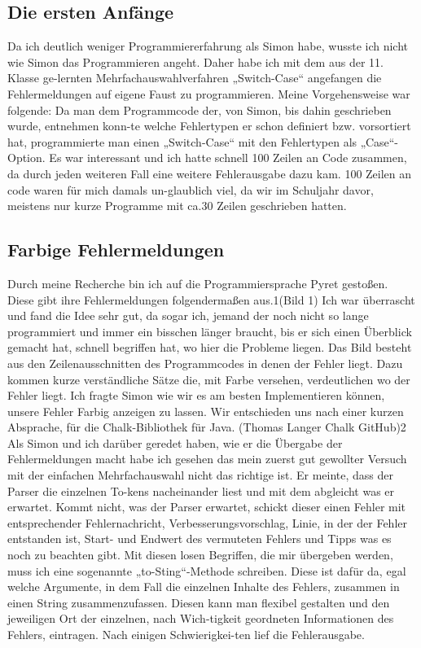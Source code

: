 \documentclass[a4paper, 12pt]{article}
\begin{document}
\subsection{Die ersten Anfänge}
Da ich deutlich weniger Programmiererfahrung als Simon habe, wusste ich nicht wie Simon das Programmieren angeht. Daher habe ich mit dem aus der 11. Klasse ge-lernten Mehrfachauswahlverfahren „Switch-Case“ angefangen die Fehlermeldungen auf eigene Faust zu programmieren.  Meine Vorgehensweise war folgende: Da man dem Programmcode der, von Simon, bis dahin geschrieben wurde, entnehmen konn-te welche Fehlertypen er schon definiert bzw. vorsortiert hat, programmierte man einen „Switch-Case“ mit den Fehlertypen als „Case“-Option. Es war interessant und ich hatte schnell 100 Zeilen an Code zusammen, da durch jeden weiteren Fall eine weitere Fehlerausgabe dazu kam. 100 Zeilen an code waren für mich damals un-glaublich viel, da wir im Schuljahr davor, meistens nur kurze Programme mit ca.30 Zeilen geschrieben hatten.

\subsection{Farbige Fehlermeldungen}
Durch meine Recherche bin ich auf die Programmiersprache Pyret gestoßen. Diese gibt ihre Fehlermeldungen folgendermaßen aus.1(Bild 1)
Ich war überrascht und fand die Idee sehr gut, da sogar ich, jemand der noch nicht so lange programmiert und immer ein bisschen länger braucht, bis er sich einen Überblick gemacht hat, schnell begriffen hat, wo hier die Probleme liegen. Das Bild besteht aus den Zeilenausschnitten des Programmcodes in denen der Fehler liegt. Dazu kommen kurze verständliche Sätze die, mit Farbe versehen, verdeutlichen wo der Fehler liegt. 
Ich fragte Simon wie wir es am besten Implementieren können, unsere Fehler Farbig anzeigen zu lassen. Wir entschieden uns nach einer kurzen Absprache, für die Chalk-Bibliothek für Java. (Thomas Langer Chalk GitHub)2
Als Simon und ich darüber geredet haben, wie er die Übergabe der Fehlermeldungen macht habe ich gesehen das mein zuerst gut gewollter Versuch mit der einfachen Mehrfachauswahl nicht das richtige ist. Er meinte, dass der Parser die einzelnen To-kens nacheinander liest und mit dem abgleicht was er erwartet. Kommt nicht, was der Parser erwartet, schickt dieser einen Fehler mit entsprechender Fehlernachricht, Verbesserungsvorschlag, Linie, in der der Fehler entstanden ist, Start- und Endwert des vermuteten Fehlers und Tipps was es noch zu beachten gibt. 
Mit diesen losen Begriffen, die mir übergeben werden, muss ich eine sogenannte „to-Sting“-Methode schreiben. Diese ist dafür da, egal welche Argumente, in dem Fall die einzelnen Inhalte des Fehlers, zusammen in einen String zusammenzufassen. Diesen kann man flexibel gestalten und den jeweiligen Ort der einzelnen, nach Wich-tigkeit geordneten Informationen des Fehlers, eintragen. Nach einigen Schwierigkei-ten lief die Fehlerausgabe. 
\end{document}
